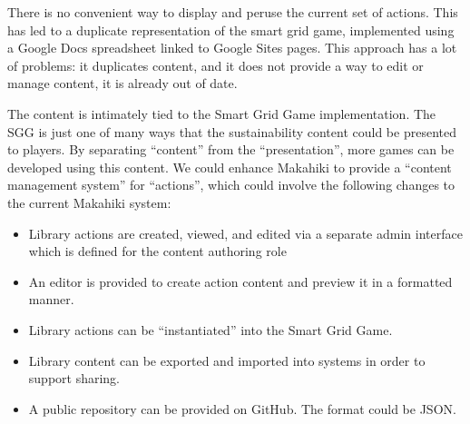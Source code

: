There is no convenient way to display and peruse the current set of actions. This has led to a duplicate representation of the smart grid game, implemented using a Google Docs spreadsheet linked to Google Sites pages. This approach has a lot of problems: it duplicates content, and it does not provide a way to edit or manage content, it is already out of date.

The content is intimately tied to the Smart Grid Game implementation. The SGG is just one of many ways that the sustainability content could be presented to players. By separating ``content'' from the ``presentation'', more games can be developed using this content. We could enhance Makahiki to provide a ``content management system'' for ``actions'', which could involve the following changes to the current Makahiki system:
\begin{itemize}
\item Library actions are created, viewed, and edited via a separate admin interface which is defined for the content authoring role
\item An editor is provided to create action content and preview it in a formatted manner.
\item Library actions can be ``instantiated'' into the Smart Grid Game. 
\item Library content can be exported and imported into systems in order to support sharing. 
\item A public repository can be provided on GitHub. The format could be JSON.
\end{itemize}


